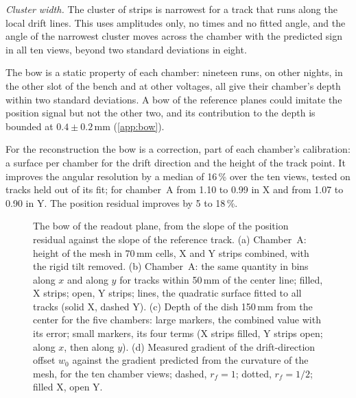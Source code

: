 \emph{Cluster width.} The cluster of strips is narrowest for a track that runs along the local drift lines. This uses
amplitudes only, no times and no fitted angle, and the angle of the narrowest cluster moves across the chamber with
the predicted sign in all ten views, beyond two standard deviations in eight.

The bow is a static property of each chamber: nineteen runs, on other nights, in the other slot of the bench
and at other voltages, all give their chamber's depth within two standard deviations. A bow of the reference planes
could imitate the position signal but not the other two, and its contribution to the depth is bounded at
$0.4\pm0.2$\,mm (\cref{app:bow}).

For the reconstruction the bow is a correction, part of each chamber's calibration: a surface per chamber for the
drift direction and the height of the track point. It improves the angular resolution by a median of 16\,\% over the
ten views, tested on tracks held out of its fit; for chamber~A from 1.10 to 0.99\textdegree{} in X and from 1.07 to
0.90\textdegree{} in Y. The position residual improves by 5 to 18\,\%.

\begin{figure}[tbp]
  \centering
  \caption{The bow of the readout plane, from the slope of the position residual against the slope of the reference
  track. (a) Chamber~A: height of the mesh in 70\,mm cells, X and Y strips combined, with the rigid tilt removed. (b)
  Chamber~A: the same quantity in bins along $x$ and along $y$ for tracks within 50\,mm of the center line; filled, X
  strips; open, Y strips; lines, the quadratic surface fitted to all tracks (solid X, dashed Y). (c) Depth of the dish
  150\,mm from the center for the five chambers: large markers, the combined value with its error; small markers, its
  four terms (X strips filled, Y strips open; along $x$, then along $y$). (d) Measured gradient of the drift-direction
  offset $w_0$ against the gradient predicted from the curvature of the mesh, for the ten chamber views; dashed,
  $r_f=1$; dotted, $r_f=1/2$; filled X, open Y.}
  \label{fig:bow}
\end{figure}

